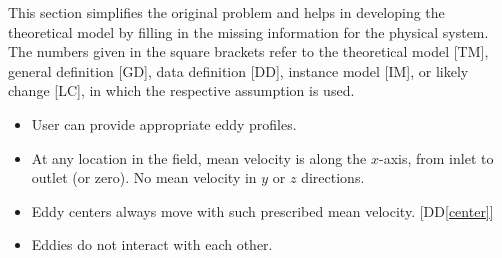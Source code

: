 \documentclass[12pt]{article}
\newcommand{\ddref}[1]{DD\ref{#1}}
\newcounter{assumpnum} %
\begin{document}

This section simplifies the original problem and helps in developing the
theoretical model by filling in the missing information for the physical system.
The numbers given in the square brackets refer to the theoretical model [TM],
general definition [GD], data definition [DD], instance model [IM], or likely
change [LC], in which the respective assumption is used.

\begin{itemize}

\item[A\refstepcounter{assumpnum}\theassumpnum \label{A_eddy}:] User can provide appropriate eddy profiles.
\item[A\refstepcounter{assumpnum}\theassumpnum \label{A_xVel}:] At any location in the field, mean velocity is along the $x$-axis, from inlet to outlet (or zero). No mean velocity in $y$ or $z$ directions.
\item[A\refstepcounter{assumpnum}\theassumpnum \label{A_center}:] Eddy centers always move with such prescribed mean velocity. [\ddref{center}]
\item[A\refstepcounter{assumpnum}\theassumpnum \label{A_noInteract}:] Eddies do not interact with each other.

\end{itemize}
\end{document}
